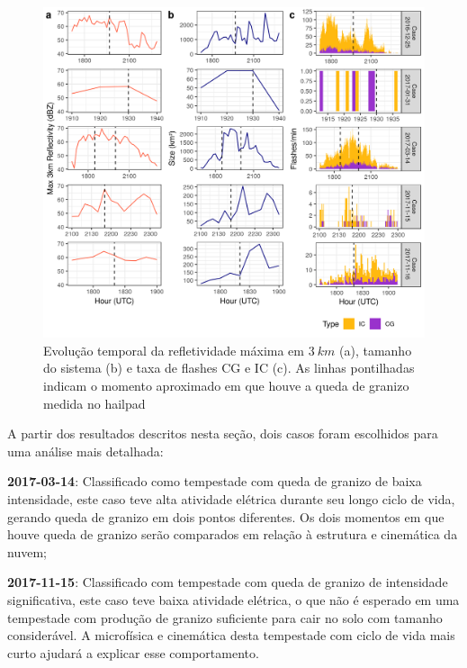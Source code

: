 \begin{figure}[hp]
	\begin{center}
		\caption{Evolução temporal da refletividade máxima em $3\:km$ (a), tamanho do sistema (b) e taxa de flashes CG e IC (c). As linhas pontilhadas indicam o momento aproximado em que houve a queda de granizo medida no hailpad} 
		\label{painel_ciclo}
		\includegraphics[width=0.99\columnwidth]{../General_Processing/figures/cases_dbz_size_lightning.png}
	\end{center}
\end{figure}



A partir dos resultados descritos nesta seção, dois casos foram escolhidos para uma análise mais detalhada:

\begin{alineas}
	\item \textbf{2017-03-14}: Classificado como tempestade com queda de granizo de baixa intensidade, este caso teve alta atividade elétrica durante seu longo ciclo de vida, gerando queda de granizo em dois pontos diferentes. Os dois momentos em que houve queda de granizo serão comparados em relação à estrutura e cinemática da nuvem;
	\item \textbf{2017-11-15}: Classificado com tempestade com queda de granizo de intensidade significativa, este caso teve baixa atividade elétrica, o que não é esperado em uma tempestade com produção de granizo suficiente para cair no solo com tamanho considerável. A microfísica e cinemática desta tempestade com ciclo de vida mais curto ajudará a explicar esse comportamento.
\end{alineas}

